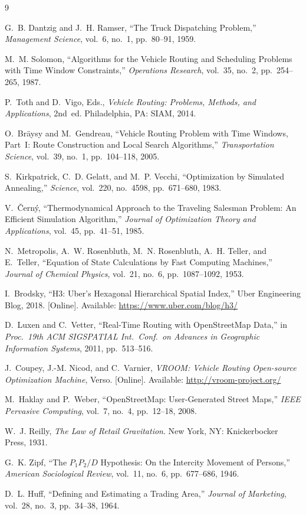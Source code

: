 \documentclass[11pt,a4paper,twocolumn]{article}
\begin{document}
\begin{thebibliography}{9}
\small

G.~B. Dantzig and J.~H. Ramser,
``The Truck Dispatching Problem,''
\emph{Management Science}, vol.~6, no.~1, pp.~80--91, 1959.

M.~M. Solomon,
``Algorithms for the Vehicle Routing and Scheduling Problems with Time
Window Constraints,''
\emph{Operations Research}, vol.~35, no.~2, pp.~254--265, 1987.

P.~Toth and D.~Vigo, Eds.,
\emph{Vehicle Routing: Problems, Methods, and Applications}, 2nd~ed.
Philadelphia, PA: SIAM, 2014.

O.~Br{\"a}ysy and M.~Gendreau,
``Vehicle Routing Problem with Time Windows, Part~I: Route Construction
and Local Search Algorithms,''
\emph{Transportation Science}, vol.~39, no.~1, pp.~104--118, 2005.

S.~Kirkpatrick, C.~D. Gelatt, and M.~P. Vecchi,
``Optimization by Simulated Annealing,''
\emph{Science}, vol.~220, no.~4598, pp.~671--680, 1983.

V.~{\v C}ern{\'y},
``Thermodynamical Approach to the Traveling Salesman Problem: An
Efficient Simulation Algorithm,''
\emph{Journal of Optimization Theory and Applications}, vol.~45,
pp.~41--51, 1985.

N.~Metropolis, A.~W. Rosenbluth, M.~N. Rosenbluth, A.~H. Teller, and
E.~Teller,
``Equation of State Calculations by Fast Computing Machines,''
\emph{Journal of Chemical Physics}, vol.~21, no.~6, pp.~1087--1092, 1953.

I.~Brodsky,
``H3: Uber's Hexagonal Hierarchical Spatial Index,''
Uber Engineering Blog, 2018.
[Online]. Available: \url{https://www.uber.com/blog/h3/}

D.~Luxen and C.~Vetter,
``Real-Time Routing with OpenStreetMap Data,''
in \emph{Proc.\ 19th ACM SIGSPATIAL Int.\ Conf.\ on Advances in
Geographic Information Systems}, 2011, pp.~513--516.

J.~Coupey, J.-M. Nicod, and C.~Varnier,
\emph{VROOM: Vehicle Routing Open-source Optimization Machine}, Verso.
[Online]. Available: \url{http://vroom-project.org/}

M.~Haklay and P.~Weber,
``OpenStreetMap: User-Generated Street Maps,''
\emph{IEEE Pervasive Computing}, vol.~7, no.~4, pp.~12--18, 2008.

W.~J. Reilly,
\emph{The Law of Retail Gravitation}.
New York, NY: Knickerbocker Press, 1931.

G.~K. Zipf,
``The $P_1 P_2 / D$ Hypothesis: On the Intercity Movement of Persons,''
\emph{American Sociological Review}, vol.~11, no.~6, pp.~677--686, 1946.

D.~L. Huff,
``Defining and Estimating a Trading Area,''
\emph{Journal of Marketing}, vol.~28, no.~3, pp.~34--38, 1964.

\end{thebibliography}
\end{document}
